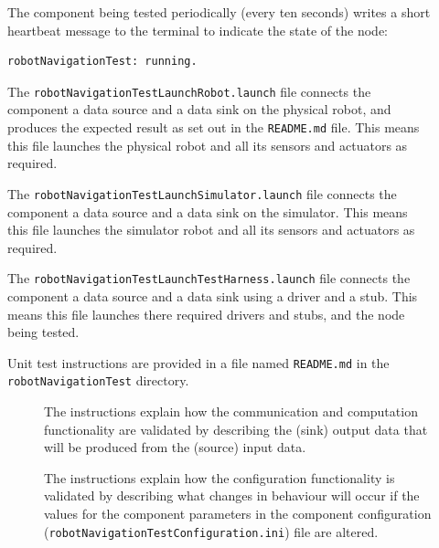 \documentclass{CSSRforAfrica}
\newcommand{\checkboxChecked}{\fbox{\ding{51}}} %
\newcommand{\checkboxDashed}{\fbox{--}}         %
\begin{document}
\begin{description}
\item[\checkboxChecked] The component being tested periodically (every ten seconds) writes a short heartbeat message to the terminal to indicate the state of the node:
{\small
\begin{verbatim}
robotNavigationTest: running.
\end{verbatim}
}

\item[\checkboxChecked] The {\small \verb+robotNavigationTestLaunchRobot.launch+} file  connects the component a data source and a data sink on the physical robot, and produces the expected result as set out in the  \small {\texttt{README.md}}   file.    This means this file launches the physical robot and all its sensors and actuators as required.

\item[\checkboxDashed] The {\small \verb+robotNavigationTestLaunchSimulator.launch+} file  connects the component a data source and a data sink on the simulator.    This means this file launches the simulator robot and all its sensors and actuators as required.

\item[\checkboxChecked] The {\small \verb+robotNavigationTestLaunchTestHarness.launch+} file  connects the component a data source and a data sink using a driver and a stub.   This means this file launches there required drivers and stubs, and the node being tested.

\item[\checkboxChecked] Unit test instructions are provided in a file named {\small \verb+README.md+} in the {\small \verb+robotNavigationTest+} directory.

\begin{description}

\item[\checkboxChecked] The instructions  explain how the  communication and computation functionality are validated by describing the (sink) output data that will be produced from the (source) input data.  

\item[\checkboxChecked] The instructions  explain how the  configuration functionality is validated by describing what changes in behaviour will occur if the values for the component parameters in the component configuration ({\small \verb+robotNavigationTestConfiguration.ini+}) file are altered.

\end{description}
\end{description}
\newpage
\end{document}
